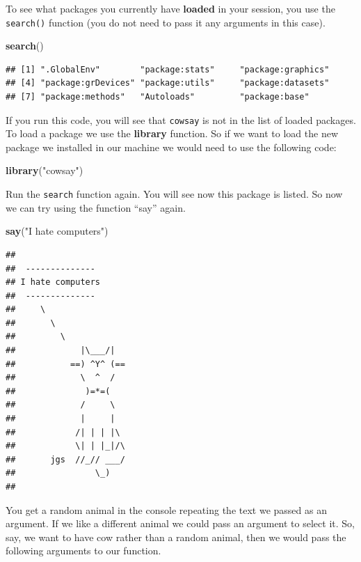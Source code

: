 \documentclass[]{book}
\newenvironment{Shaded}{\begin{snugshade}}{\end{snugshade}}
\newcommand{\KeywordTok}[1]{\textcolor[rgb]{0.13,0.29,0.53}{\textbf{#1}}}
\newcommand{\NormalTok}[1]{#1}
\newcommand{\StringTok}[1]{\textcolor[rgb]{0.31,0.60,0.02}{#1}}
\begin{document}
To see what packages you currently have \textbf{loaded} in your session, you use the \texttt{search()} function (you do not need to pass it any arguments in this case).

\begin{Shaded}
\begin{Highlighting}[]
\KeywordTok{search}\NormalTok{()}
\end{Highlighting}
\end{Shaded}

\begin{verbatim}
## [1] ".GlobalEnv"        "package:stats"     "package:graphics" 
## [4] "package:grDevices" "package:utils"     "package:datasets" 
## [7] "package:methods"   "Autoloads"         "package:base"
\end{verbatim}

If you run this code, you will see that \texttt{cowsay} is not in the list of loaded packages. To load a package we use the \textbf{library} function. So if we want to load the new package we installed in our machine we would need to use the following code:

\begin{Shaded}
\begin{Highlighting}[]
\KeywordTok{library}\NormalTok{(}\StringTok{"cowsay"}\NormalTok{)}
\end{Highlighting}
\end{Shaded}

Run the \texttt{search} function again. You will see now this package is listed. So now we can try using the function ``say'' again.

\begin{Shaded}
\begin{Highlighting}[]
\KeywordTok{say}\NormalTok{(}\StringTok{"I hate computers"}\NormalTok{)}
\end{Highlighting}
\end{Shaded}

\begin{verbatim}
## 
##  -------------- 
## I hate computers 
##  --------------
##     \
##       \
##         \
##             |\___/|
##           ==) ^Y^ (==
##             \  ^  /
##              )=*=(
##             /     \
##             |     |
##            /| | | |\
##            \| | |_|/\
##       jgs  //_// ___/
##                \_)
## 
\end{verbatim}

You get a random animal in the console repeating the text we passed as an argument. If we like a different animal we could pass an argument to select it. So, say, we want to have cow rather than a random animal, then we would pass the following arguments to our function.
\end{document}

